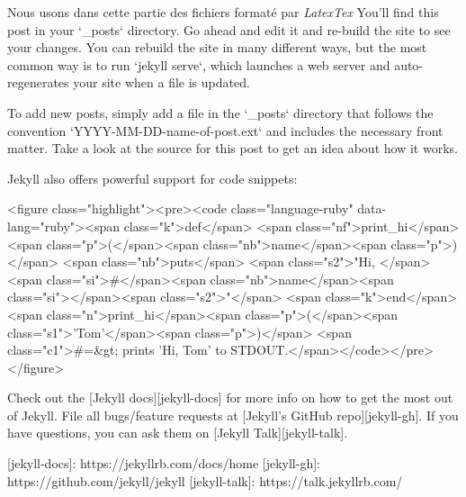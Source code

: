 Nous usons dans cette partie des fichiers formaté par  \emph{LatexTex}
You’ll find this post in your `_posts` directory. Go ahead and edit it and re-build the site to see your changes. You can rebuild the site in many different ways, but the most common way is to run `jekyll serve`, which launches a web server and auto-regenerates your site when a file is updated.

To add new posts, simply add a file in the `_posts` directory that follows the convention `YYYY-MM-DD-name-of-post.ext` and includes the necessary front matter. Take a look at the source for this post to get an idea about how it works.

Jekyll also offers powerful support for code snippets:

<figure class="highlight"><pre><code class="language-ruby" data-lang="ruby"><span class="k">def</span> <span class="nf">print_hi</span><span class="p">(</span><span class="nb">name</span><span class="p">)</span>
  <span class="nb">puts</span> <span class="s2">"Hi, </span><span class="si">#{</span><span class="nb">name</span><span class="si">}</span><span class="s2">"</span>
<span class="k">end</span>
<span class="n">print_hi</span><span class="p">(</span><span class="s1">'Tom'</span><span class="p">)</span>
<span class="c1">#=&gt; prints 'Hi, Tom' to STDOUT.</span></code></pre></figure>

Check out the [Jekyll docs][jekyll-docs] for more info on how to get the most out of Jekyll. File all bugs/feature requests at [Jekyll’s GitHub repo][jekyll-gh]. If you have questions, you can ask them on [Jekyll Talk][jekyll-talk].

[jekyll-docs]: https://jekyllrb.com/docs/home
[jekyll-gh]:   https://github.com/jekyll/jekyll
[jekyll-talk]: https://talk.jekyllrb.com/
